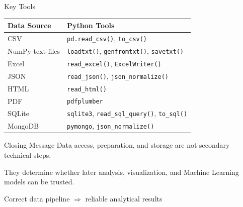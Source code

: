 \documentclass[aspectratio=169,11pt]{beamer}
\newcommand{\code}[1]{\texttt{#1}}
\newcommand{\smallgap}{\vspace{0.4em}}
\begin{document}
\begin{frame}{Key Tools}
\begin{tabularx}{\textwidth}{lX}
\toprule
\textbf{Data Source} & \textbf{Python Tools} \\
\midrule
CSV & \code{pd.read\_csv()}, \code{to\_csv()} \\
NumPy text files & \code{loadtxt()}, \code{genfromtxt()}, \code{savetxt()} \\
Excel & \code{read\_excel()}, \code{ExcelWriter()} \\
JSON & \code{read\_json()}, \code{json\_normalize()} \\
HTML & \code{read\_html()} \\
PDF & \code{pdfplumber} \\
SQLite & \code{sqlite3}, \code{read\_sql\_query()}, \code{to\_sql()} \\
MongoDB & \code{pymongo}, \code{json\_normalize()} \\
\bottomrule
\end{tabularx}
\end{frame}

\begin{frame}{Closing Message}
Data access, preparation, and storage are not secondary technical steps.

\smallgap
They determine whether later analysis, visualization, and Machine Learning models can be trusted.

\smallgap
\begin{center}
\Large Correct data pipeline $\Rightarrow$ reliable analytical results
\end{center}
\end{frame}
\end{document}

